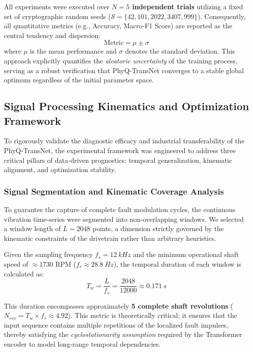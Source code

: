 \documentclass[5p,times,twocolumn]{elsarticle}
\begin{document}
All experiments were executed over \textbf{$N=5$ independent trials} utilizing a fixed set of cryptographic random seeds ($\mathcal{S} = \{42, 101, 2022, 3407, 999\}$). Consequently, all quantitative metrics (e.g., Accuracy, Macro-F1 Score) are reported as the central tendency and dispersion:
\begin{equation}
    \text{Metric} = \mu \pm \sigma
\end{equation}
where $\mu$ is the mean performance and $\sigma$ denotes the standard deviation. This approach explicitly quantifies the \textit{aleatoric uncertainty} of the training process, serving as a robust verification that PhyQ-TransNet converges to a stable global optimum regardless of the initial parameter space.

\subsection{Signal Processing Kinematics and Optimization Framework}
To rigorously validate the diagnostic efficacy and industrial transferability of the PhyQ-TransNet, the experimental framework was engineered to address three critical pillars of data-driven prognostics: temporal generalization, kinematic alignment, and optimization stability.

\subsubsection{Signal Segmentation and Kinematic Coverage Analysis}
To guarantee the capture of complete fault modulation cycles, the continuous vibration time-series were segmented into non-overlapping windows. We selected a window length of $L = 2048$ points, a dimension strictly governed by the kinematic constraints of the drivetrain rather than arbitrary heuristics.

Given the sampling frequency $f_s = \SI{12}{kHz}$ and the minimum operational shaft speed of $\approx 1730$ RPM ($f_r \approx \SI{28.8}{Hz}$), the temporal duration of each window is calculated as:
\begin{equation}
    T_w = \frac{L}{f_s} = \frac{2048}{12000} \approx \SI{0.171}{s}
\end{equation}



This duration encompasses approximately \textbf{5 complete shaft revolutions} ($N_{rev} = T_w \times f_r \approx 4.92$). This metric is theoretically critical; it ensures that the input sequence contains multiple repetitions of the localized fault impulses, thereby satisfying the \textit{cyclostationarity assumption} required by the Transformer encoder to model long-range temporal dependencies.
\end{document}
